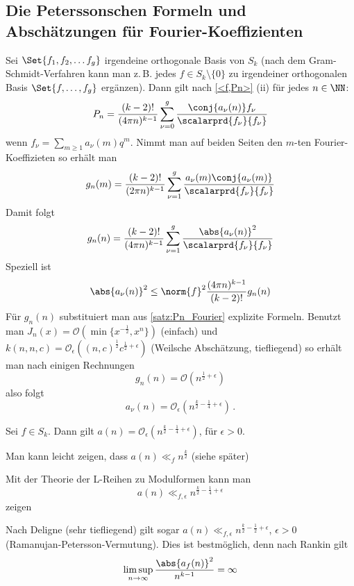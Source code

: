 \subsection{Die Peterssonschen Formeln und Abschätzungen für Fourier-Koeffizienten}

Sei $\Set{f_1, f_2, \ldots f_g}$ irgendeine orthogonale Basis von $S_k$ (nach dem Gram-Schmidt-Verfahren kann man z.\,B. jedes $f\in S_k\setminus\{0\}$ zu irgendeiner orthogonalen Basis $\Set{f, \ldots, f_g}$ ergänzen).
Dann gilt nach \autoref{<f,Pn>} (ii) für jedes $n\in\NN$:
\[
	P_n = \frac{(k-2)!}{(4\pi n)^{k-1}} \sum_{\nu = 0}^g \frac{\conj{a_\nu(n)}f_\nu}{\scalarprd{f_\nu}{f_\nu}}
\]
wenn $f_\nu = \sum_{m\geq 1} a_\nu(m) q^m$.
Nimmt man auf beiden Seiten den $m$-ten Fourier-Koeffizieten so erhält man
\[
	g_n(m) = \frac{(k-2)!}{(2\pi n)^{k-1}} \sum_{\nu=1}^g \frac{a_\nu(m) \conj{a_\nu(m)}}{\scalarprd{f_\nu}{f_\nu}}
\]
Damit folgt
\[
	g_n(n) = \frac{(k-2)!}{(4\pi n)^{k-1}} \sum_{\nu = 1}^g \frac{\abs{a_\nu(n)}^2}{\scalarprd{f_\nu}{f_\nu}}
\]
Speziell ist
\[
	\abs{a_\nu(n)}^2 \leq \norm{f}^2 \frac{(4\pi n)^{k-1}}{(k-2)!} g_n(n)
\]
Für $g_n(n)$ substituiert man aus \autoref{satz:Pn_Fourier} explizite Formeln. Benutzt man $J_n(x) = \mathcal{O}(\min \{x^{-\frac{1}{2}}, x^n\})$ (einfach) und $k(n,n,c) = \mathcal{O}_\epsilon( (n,c)^{\frac{1}{2}}c^{\frac{1}{2}+\epsilon})$ (Weilsche Abschätzung, tiefliegend) so erhält man nach einigen Rechnungen
\[
	g_n(n) = \mathcal{O} (n^{\frac{1}{2}+\epsilon})
\]
also folgt
\[
	a_\nu(n) = \mathcal{O}_\epsilon(n^{\frac{k}{2}-\frac{1}{4} + \epsilon} )
	\,.
\]

\begin{satz}
	Sei $f \in S_k$. Dann gilt $a(n) = \mathcal{O}_\epsilon (n^{\frac{k}{2}-\frac{1}{4} + \epsilon})$, für $\epsilon > 0$.
\end{satz}

\begin{beme-list}
	\item Man kann leicht zeigen, dass $a(n) \ll_f n^{\frac{k}{2}}$ (siehe später)
	\item Mit der Theorie der L-Reihen zu Modulformen kann man
	\[
		a(n) \ll_{f,\epsilon} n^{\frac{k}{2} - \frac{1}{4} + \epsilon}
	\]
	zeigen
	\item Nach Deligne (sehr tiefliegend) gilt sogar $a(n) \ll_{f,\epsilon} n^{\frac{k}{2}-\frac{1}{2}+\epsilon}$, $\epsilon > 0$ (Ramanujan-Petersson-Vermutung).
	Dies ist bestmöglich, denn nach Rankin gilt
	\[
		\limsup_{n\to\infty} \frac{\abs{a_f(n)}^2}{n^{k-1}} = \infty
	\]
	
\end{beme-list}

